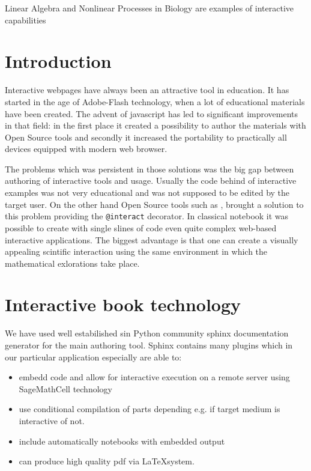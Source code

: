 \documentclass{deliverablereport}
\author{Marcin Kostur, Jerzy Łuczka, Jan Aksamit, Jolanta Marzec}
\begin{document}
\maketitle

Linear Algebra and Nonlinear Processes in Biology are examples of
interactive capabilities


\section{Introduction}

Interactive webpages have always been an attractive tool in
education. It has started in the age of Adobe-Flash technology, when a
lot of educational materials have been created. The advent of
javascript has led to significant improvements in that field: in the
first place it created a possibility to author the materials with Open
Source tools and secondly it increased the portability to practically
all devices equipped with modern web browser.

The problems which was persistent in those solutions was the big gap
between authoring of interactive tools and usage. Usually the code
behind of interactive examples was not very educational and was not
supposed to be edited by the target user. On the other hand Open
Source tools such as \Sage, brought a solution to this problem
providing the \texttt{@interact} decorator. In classical \Sage
notebook it was possible to create with single slines of code even
quite complex web-based interactive applications. The biggest
advantage is that one can create a visually appealing scintific
interaction using the same environment in which the mathematical
exlorations take place.




\section{Interactive book technology}

We have used well estabilished sin Python community sphinx
documentation generator for the main authoring tool. Sphinx contains
many plugins  which in our particular application especially are able to:

\begin{itemize}
\item embedd \Sage code and allow for interactive execution on a
  remote server using SageMathCell  technology
\item use conditional compilation of parts depending e.g. if target medium is interactive of not.
\item include automatically \Jupyter notebooks with embedded output
\item  can produce high quality  pdf via \LaTeX system.
\end{itemize}  
\end{document}
